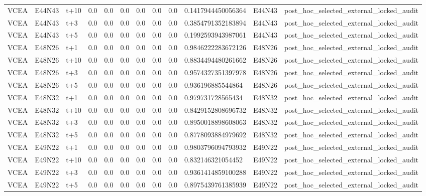 \begin{landscape}
\begin{longtable}{llllllllllll}
VCEA & E44N43 & t+10 & 0.0 & 0.0 & 0.0 & 0.0 & 0.0 & 0.0 & 0.1417944450056364 & E44N43 & post\_hoc\_selected\_external\_locked\_audit \\
VCEA & E44N43 & t+3 & 0.0 & 0.0 & 0.0 & 0.0 & 0.0 & 0.0 & 0.3854791352183894 & E44N43 & post\_hoc\_selected\_external\_locked\_audit \\
VCEA & E44N43 & t+5 & 0.0 & 0.0 & 0.0 & 0.0 & 0.0 & 0.0 & 0.1992593943987061 & E44N43 & post\_hoc\_selected\_external\_locked\_audit \\
VCEA & E48N26 & t+1 & 0.0 & 0.0 & 0.0 & 0.0 & 0.0 & 0.0 & 0.9846222283672126 & E48N26 & post\_hoc\_selected\_external\_locked\_audit \\
VCEA & E48N26 & t+10 & 0.0 & 0.0 & 0.0 & 0.0 & 0.0 & 0.0 & 0.8834494480261662 & E48N26 & post\_hoc\_selected\_external\_locked\_audit \\
VCEA & E48N26 & t+3 & 0.0 & 0.0 & 0.0 & 0.0 & 0.0 & 0.0 & 0.9574327351397978 & E48N26 & post\_hoc\_selected\_external\_locked\_audit \\
VCEA & E48N26 & t+5 & 0.0 & 0.0 & 0.0 & 0.0 & 0.0 & 0.0 & 0.936196885544864 & E48N26 & post\_hoc\_selected\_external\_locked\_audit \\
VCEA & E48N32 & t+1 & 0.0 & 0.0 & 0.0 & 0.0 & 0.0 & 0.0 & 0.979731728565434 & E48N32 & post\_hoc\_selected\_external\_locked\_audit \\
VCEA & E48N32 & t+10 & 0.0 & 0.0 & 0.0 & 0.0 & 0.0 & 0.0 & 0.8429152808696732 & E48N32 & post\_hoc\_selected\_external\_locked\_audit \\
VCEA & E48N32 & t+3 & 0.0 & 0.0 & 0.0 & 0.0 & 0.0 & 0.0 & 0.8950018898608063 & E48N32 & post\_hoc\_selected\_external\_locked\_audit \\
VCEA & E48N32 & t+5 & 0.0 & 0.0 & 0.0 & 0.0 & 0.0 & 0.0 & 0.8778093884979692 & E48N32 & post\_hoc\_selected\_external\_locked\_audit \\
VCEA & E49N22 & t+1 & 0.0 & 0.0 & 0.0 & 0.0 & 0.0 & 0.0 & 0.9803796094793932 & E49N22 & post\_hoc\_selected\_external\_locked\_audit \\
VCEA & E49N22 & t+10 & 0.0 & 0.0 & 0.0 & 0.0 & 0.0 & 0.0 & 0.832146321054452 & E49N22 & post\_hoc\_selected\_external\_locked\_audit \\
VCEA & E49N22 & t+3 & 0.0 & 0.0 & 0.0 & 0.0 & 0.0 & 0.0 & 0.9361414859100288 & E49N22 & post\_hoc\_selected\_external\_locked\_audit \\
VCEA & E49N22 & t+5 & 0.0 & 0.0 & 0.0 & 0.0 & 0.0 & 0.0 & 0.8975439761385939 & E49N22 & post\_hoc\_selected\_external\_locked\_audit \\

\end{longtable}
\end{landscape}

